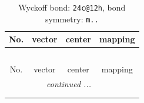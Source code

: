 \documentclass[fleqn,8pt]{jsarticle}
\begin{document}
\renewcommand{\arraystretch}{1.2}
\begin{longtable}{cccc}
\caption{Wyckoff bond: {\tt 24c@12h}, bond symmetry: {\tt m..}}
 \\
 \hline \hline
No. & vector & center & mapping \\ \hline \endfirsthead

\multicolumn{3}{l}{\tablename\ \thetable{}} \\
 \hline \hline
No. & vector & center & mapping \\ \hline \endhead

 \hline \hline
\multicolumn{3}{r}{\footnotesize\it continued ...} \\ \endfoot

 \hline \hline
\multicolumn{3}{r}{} \\ \endlastfoot


\end{longtable}
\end{document}
